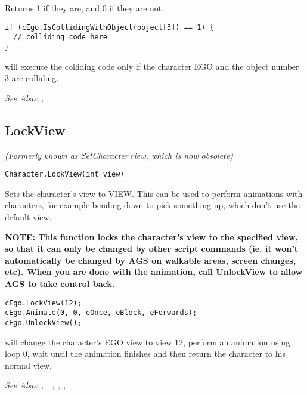 Returns 1 if they are, and 0 if they are not.

\begin{verbatim}
if (cEgo.IsCollidingWithObject(object[3]) == 1) {
  // colliding code here
}
\end{verbatim}
will execute the colliding code only if the character EGO and the object number 3 are colliding.

\it{See Also:} ,
,


\subsection{LockView}\label{Character.LockView}%

\it{(Formerly known as SetCharacterView, which is now obsolete)}

\begin{verbatim}
Character.LockView(int view)
\end{verbatim}

Sets the character's view to VIEW. This can be used to perform animations
with characters, for example bending down to pick something up, which don't
use the default view.

\bf{NOTE:} This function locks the character's view to the specified view, so
that it can only be changed by other script commands (ie. it won't
automatically be changed by AGS on walkable areas, screen changes,
etc). When you are done with the animation, call UnlockView to allow AGS to
take control back.

\begin{verbatim}
cEgo.LockView(12);
cEgo.Animate(0, 0, eOnce, eBlock, eForwards);
cEgo.UnlockView();
\end{verbatim}
will change the character's EGO view to view 12, perform an animation using loop 0,
wait until the animation finishes and then return the character to his normal view.

\it{See Also:} ,
,
,
,
,


